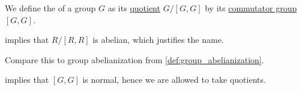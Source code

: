 \begin{definition}\label{def:ring_abelianization}\mimprovised
   We define the  of a group \( G \) as its \hyperref[def:group/quotient]{quotient} \( G / [G, G] \) by its \hyperref[def:group_commutator]{commutator group} \( [G, G] \).
\end{definition}
\begin{comments}
  \item {} implies that \( R / [R, R] \) is abelian, which justifies the name.
  \item Compare this to group abelianization from \cref{def:group_abelianization}.
\end{comments}
\begin{defproof}
   implies that \( [G, G] \) is normal, hence we are allowed to take quotients.
\end{defproof}

